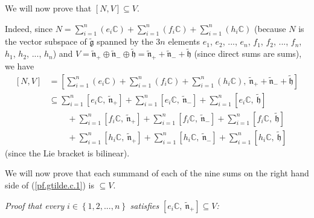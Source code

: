 \documentclass[etingof-lie.tex]{subfiles}
\begin{document}
We will now prove that $\left[  N,V\right]  \subseteq V$.

Indeed, since $N=\sum\limits_{i=1}^{n}\left(  e_{i}\mathbb{C}\right)
+\sum\limits_{i=1}^{n}\left(  f_{i}\mathbb{C}\right)  +\sum\limits_{i=1}%
^{n}\left(  h_{i}\mathbb{C}\right)  $ (because $N$ is the vector subspace of
$\widetilde{\mathfrak{g}}$ spanned by the $3n$ elements $e_{1}$, $e_{2}$,
$...$, $e_{n}$, $f_{1}$, $f_{2}$, $...$, $f_{n}$, $h_{1}$, $h_{2}$, $...$,
$h_{n}$) and $V=\widetilde{\mathfrak{n}}_{+}\oplus\widetilde{\mathfrak{n}}%
_{-}\oplus\widetilde{\mathfrak{h}}=\widetilde{\mathfrak{n}}_{+}%
+\widetilde{\mathfrak{n}}_{-}+\widetilde{\mathfrak{h}}$ (since direct sums are
sums), we have%
\begin{align}
\left[  N,V\right]   &  =\left[  \sum\limits_{i=1}^{n}\left(  e_{i}%
\mathbb{C}\right)  +\sum\limits_{i=1}^{n}\left(  f_{i}\mathbb{C}\right)
+\sum\limits_{i=1}^{n}\left(  h_{i}\mathbb{C}\right)
,\ \widetilde{\mathfrak{n}}_{+}+\widetilde{\mathfrak{n}}_{-}%
+\widetilde{\mathfrak{h}}\right] \nonumber\\
&  \subseteq\sum\limits_{i=1}^{n}\left[  e_{i}\mathbb{C}%
,\ \widetilde{\mathfrak{n}}_{+}\right]  +\sum\limits_{i=1}^{n}\left[
e_{i}\mathbb{C},\ \widetilde{\mathfrak{n}}_{-}\right]  +\sum\limits_{i=1}%
^{n}\left[  e_{i}\mathbb{C},\ \widetilde{\mathfrak{h}}\right] \nonumber\\
&  \ \ \ \ \ \ \ \ \ \ +\sum\limits_{i=1}^{n}\left[  f_{i}\mathbb{C}%
,\ \widetilde{\mathfrak{n}}_{+}\right]  +\sum\limits_{i=1}^{n}\left[
f_{i}\mathbb{C},\ \widetilde{\mathfrak{n}}_{-}\right]  +\sum\limits_{i=1}%
^{n}\left[  f_{i}\mathbb{C},\ \widetilde{\mathfrak{h}}\right] \nonumber\\
&  \ \ \ \ \ \ \ \ \ \ +\sum\limits_{i=1}^{n}\left[  h_{i}\mathbb{C}%
,\ \widetilde{\mathfrak{n}}_{+}\right]  +\sum\limits_{i=1}^{n}\left[
h_{i}\mathbb{C},\ \widetilde{\mathfrak{n}}_{-}\right]  +\sum\limits_{i=1}%
^{n}\left[  h_{i}\mathbb{C},\ \widetilde{\mathfrak{h}}\right]
\label{pf.gtilde.c.1}%
\end{align}
(since the Lie bracket is bilinear).

We will now prove that each summand of each of the nine sums on the right hand
side of (\ref{pf.gtilde.c.1}) is $\subseteq V$.

\textit{Proof that every }$i\in\left\{  1,2,...,n\right\}  $\textit{ satisfies
}$\left[  e_{i}\mathbb{C},\ \widetilde{\mathfrak{n}}_{+}\right]  \subseteq
V$\textit{:}
\end{document}
